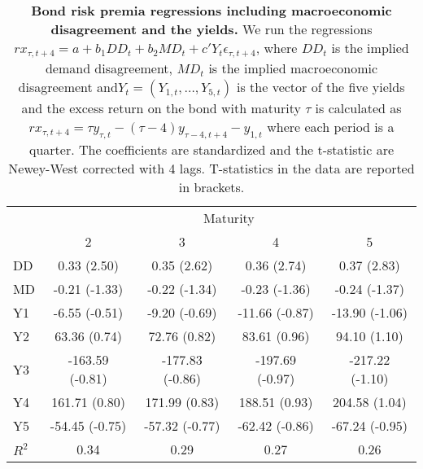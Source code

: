\begin{table}[H]
\centering
\caption{\textbf{Bond risk premia regressions including macroeconomic disagreement and the yields.} We run the regressions 
$rx_{\tau,t+4} = a + b_1 DD_t + b_2 MD_t + c'Y_t \epsilon_{\tau,t+4}$, where $DD_t$ is the implied demand disagreement, $MD_t$ is the implied macroeconomic disagreement and$Y_t=\left(Y_{1,t},\ldots,Y_{5,t}\right)$ is the vector of the five yields and the excess return on the bond with maturity $\tau$ is calculated as $rx_{\tau,t+4} = \tau y_{\tau,t} - \left(\tau-4\right)y_{\tau-4,t+4} - y_{1,t}$ where each period is a quarter. The coefficients are standardized and the t-statistic are Newey-West corrected with 4 lags. T-statistics in the data are reported in brackets.}
\begin{tabular}{lcccc}
\hline
\hline
& \multicolumn{4}{c}{Maturity} \\
 &  2 & 3 &  4 & 5 \\
\hline
DD               & 0.33 (2.50) & 0.35 (2.62) & 0.36 (2.74) & 0.37 (2.83) \\
MD        & -0.21 (-1.33) & -0.22 (-1.34) & -0.23 (-1.36) & -0.24 (-1.37) \\
Y1        & -6.55 (-0.51) & -9.20 (-0.69) & -11.66 (-0.87) & -13.90 (-1.06) \\
Y2       & 63.36 (0.74) & 72.76 (0.82) & 83.61 (0.96) & 94.10 (1.10) \\
Y3       & -163.59 (-0.81) & -177.83 (-0.86) & -197.69 (-0.97) & -217.22 (-1.10) \\
Y4      & 161.71 (0.80) & 171.99 (0.83) & 188.51 (0.93) & 204.58 (1.04) \\
Y5        & -54.45 (-0.75) & -57.32 (-0.77) & -62.42 (-0.86) & -67.24 (-0.95) \\
$R^2$                  & 0.34 & 0.29 & 0.27 & 0.26 \\
\hline
\end{tabular}
\label{table:rx2DisMD_YLD}
\end{table}

